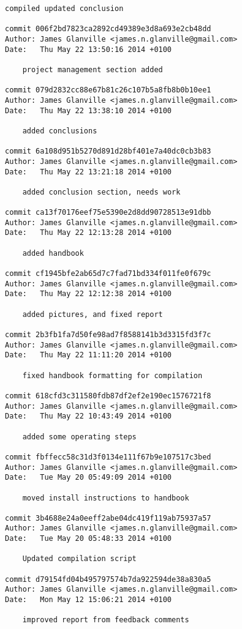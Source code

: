\documentclass[a4paper,11pt]{article}  %
\begin{document}
\begin{lstlisting}[frame=single]
    compiled updated conclusion

commit 006f2bd7823ca2892cd49389e3d8a693e2cb48dd
Author: James Glanville <james.n.glanville@gmail.com>
Date:   Thu May 22 13:50:16 2014 +0100

    project management section added

commit 079d2832cc88e67b81c26c107b5a8fb8b0b10ee1
Author: James Glanville <james.n.glanville@gmail.com>
Date:   Thu May 22 13:38:10 2014 +0100

    added conclusions

commit 6a108d951b5270d891d28bf401e7a40dc0cb3b83
Author: James Glanville <james.n.glanville@gmail.com>
Date:   Thu May 22 13:21:18 2014 +0100

    added conclusion section, needs work

commit ca13f70176eef75e5390e2d8dd90728513e91dbb
Author: James Glanville <james.n.glanville@gmail.com>
Date:   Thu May 22 12:13:28 2014 +0100

    added handbook

commit cf1945bfe2ab65d7c7fad71bd334f011fe0f679c
Author: James Glanville <james.n.glanville@gmail.com>
Date:   Thu May 22 12:12:38 2014 +0100

    added pictures, and fixed report

commit 2b3fb1fa7d50fe98ad7f8588141b3d3315fd3f7c
Author: James Glanville <james.n.glanville@gmail.com>
Date:   Thu May 22 11:11:20 2014 +0100

    fixed handbook formatting for compilation

commit 618cfd3c311580fdb87df2ef2e190ec1576721f8
Author: James Glanville <james.n.glanville@gmail.com>
Date:   Thu May 22 10:43:49 2014 +0100

    added some operating steps

commit fbffecc58c31d3f0134e111f67b9e107517c3bed
Author: James Glanville <james.n.glanville@gmail.com>
Date:   Tue May 20 05:49:09 2014 +0100

    moved install instructions to handbook

commit 3b4688e24a0eeff2abe04dc419f119ab75937a57
Author: James Glanville <james.n.glanville@gmail.com>
Date:   Tue May 20 05:48:33 2014 +0100

    Updated compilation script

commit d79154fd04b495797574b7da922594de38a830a5
Author: James Glanville <james.n.glanville@gmail.com>
Date:   Mon May 12 15:06:21 2014 +0100

    improved report from feedback comments


\end{lstlisting}
\end{document}
